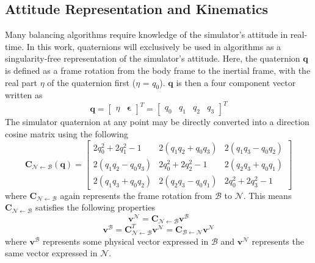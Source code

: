 \subsection{Attitude Representation and Kinematics}

Many balancing algorithms require knowledge of the simulator's attitude in real-time. In this work, quaternions will exclusively be used in algorithms as a singularity-free representation of the simulator's attitude. Here, the quaternion $\bm{q}$ is defined as a frame rotation from the body frame to the inertial frame, with the real part $\eta$ of the quaternion first ($\eta$ = $q_0$). $\bm{q}$ is then a four component vector written as 
\begin{equation}
    \bm{q} = \begin{bmatrix}
        \eta & \bm{\epsilon}
    \end{bmatrix}^T
    = \begin{bmatrix}
        q_0 & q_1 & q_2 & q_3
    \end{bmatrix}^T
\end{equation}
The simulator quaternion at any point may be directly converted into a direction cosine matrix using the following
\begin{equation}\label{equation:C_from_q}
    \bm{C}_{\mathcal{N}\leftarrow\mathcal{B}}(\bm{q})=
    \begin{bmatrix}
    2q_0^{2}+2q_1^{2}-1 & 2(q_1 q_2 + q_0 q_3) & 2(q_1 q_3 - q_0 q_2) \\
    2(q_1 q_2 - q_0 q_3) & 2q_0^{2}+2q_2^{2}-1 & 2(q_2 q_3 + q_0 q_1) \\
    2(q_1 q_3 + q_0 q_2) & 2(q_2 q_3 - q_0 q_1) & 2q_0^{2}+2q_3^{2}-1
    \end{bmatrix}
\end{equation}
where $\bm{C}_{\mathcal{N}\leftarrow\mathcal{B}}$ again represents the frame rotation from $\mathcal{B}$ to $\mathcal{N}$. This means $\bm{C}_{\mathcal{N}\leftarrow\mathcal{B}}$ satisfies the following properties
\begin{equation}
    \bm{v}^{\mathcal{N}} = 
    \bm{C}_{\mathcal{N}\leftarrow\mathcal{B}}\bm{v}^{\mathcal{B}}
\end{equation}
\begin{equation}
    \bm{v}^{\mathcal{B}} = 
    \bm{C}_{\mathcal{N}\leftarrow\mathcal{B}}^T\bm{v}^{\mathcal{N}}
    =\bm{C}_{\mathcal{B}\leftarrow\mathcal{N}}\bm{v}^{\mathcal{N}}
\end{equation}
where $\bm{v}^{\mathcal{B}}$ represents some physical vector expressed in $\mathcal{B}$ and $\bm{v}^{\mathcal{N}}$ represents the same vector expressed in $\mathcal{N}$. 

